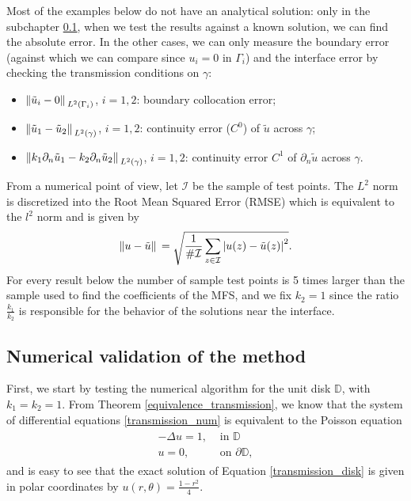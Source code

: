 Most of the examples below do not have an analytical solution: only in the subchapter \ref{transmission_val_subsection}, when we test the results against a known solution, we can find the absolute error. In the other cases, we can only measure the boundary error (against which we can compare since \(u_i=0\) in \(\Gamma_i\)) and the interface error by checking the transmission conditions on \(\gamma\):
\begin{itemize}
    \item \(\norm*{\tilde{u}_i - 0}_{L^2(\Gamma_i)}\), \(i=1, 2\): boundary collocation error;
    \item \(\norm*{\tilde{u}_1 - \tilde{u}_2}_{L^2(\gamma)}\), \(i=1, 2\): continuity error (\(C^0\)) of \(\tilde{u}\) across \(\gamma\);
    \item \(\norm*{k_1 \partial_n\tilde{u}_1 - k_2 \partial_n\tilde{u}_2}_{L^2(\gamma)}\), \(i=1, 2\): continuity error \(C^1\) of \(\partial_n\tilde{u}\) across \(\gamma\).
\end{itemize}
From a numerical point of view, let \(\mathcal{I}\) be the sample of test points. The \(L^2\) norm is discretized into the Root Mean Squared Error (\ac{RMSE}) which is equivalent to the \(l^2\) norm and is given by
\[
    \norm*{u-\tilde{u}}= \sqrt{\frac{1}{\#\mathcal{I}} \sum_{z \in \mathcal{I}} \abs{u(z)-\tilde{u}(z)}^2}.
\]
For every result below the number of sample test points is 5 times larger than the sample used to find the coefficients of the \ac{MFS}, and we fix \(k_2=1\) since the ratio \(\frac{k_1}{k_2}\) is responsible for the behavior of the solutions near the interface. 

\subsection{Numerical validation of the method}\label{transmission_val_subsection}

First, we start by testing the numerical algorithm for the unit disk \(\mathbb{D}\), with \(k_1=k_2=1\). From Theorem \ref{equivalence_transmission}, we know that the system of differential equations \eqref{transmission_num} is equivalent to the Poisson equation
\begin{align}\label{transmission_disk}
    \begin{split}
        -\Delta u = 1, & \text{ in } \mathbb{D}\\
        u = 0, & \text{ on } \partial\mathbb{D},
    \end{split}
\end{align}
and is easy to see that the exact solution of Equation \eqref{transmission_disk} is given in polar coordinates by \(u(r, \theta) = \frac{1-r^2}{4}\). 

